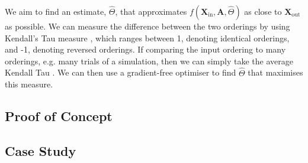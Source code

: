 \documentclass{article}
\begin{document}
We aim to find an estimate, $\hat{\Theta}$, that approximates $f\left(
\mathbf{X}_{\text{in}}, \mathbf{A}, \hat{\Theta} \right)$ as close to
$\mathbf{X}_{\text{out}}$ as possible. We can measure the difference between the
two orderings by using Kendall's Tau measure \cite{kendall38}, which ranges
between 1, denoting identical orderings, and -1, denoting reversed orderings.
If comparing the input ordering to many orderings, e.g. many trials of a
simulation, then we can simply take the average Kendall Tau \cite{hays60}.
We can then use a gradient-free optimiser to find $\hat{\Theta}$ that maximises
this measure.


\subsection{Proof of Concept}

\subsection{Case Study}




\end{document}
